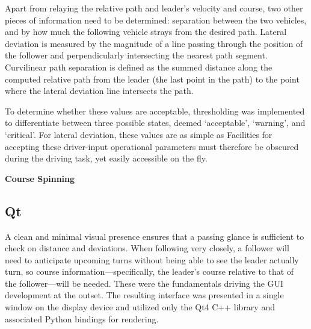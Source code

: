 \documentclass[twocolumn,10pt]{article}
\begin{document}
  Apart from relaying the relative path and leader's velocity and course, two other pieces of information need to be determined: separation between the two vehicles, and by how much the following vehicle strays from the desired path.
  Lateral deviation is measured by the magnitude of a line passing through the position of the follower and perpendicularly intersecting the nearest path segment.
  Curvilinear path separation is defined as the summed distance along the computed relative path from the leader (the last point in the path) to the point where the lateral deviation line intersects the path.


  To determine whether these values are acceptable, thresholding was implemented to differentiate between three possible states, deemed `acceptable', `warning', and `critical'.
  For lateral deviation, these values are as simple as 
  Facilities for accepting these driver-input operational parameters must therefore be obscured during the driving task, yet easily accessible on the fly. 

  \textbf{Course Spinning}

  \subsection*{Qt}
  
    A clean and minimal visual presence ensures that a passing glance is sufficient to check on distance and deviations.  When following very closely, a follower will need to anticipate upcoming turns without being able to see the leader actually turn, so course information---specifically, the leader's course relative to that of the follower---will be needed.  These were the fundamentals driving the GUI development at the outset.  The resulting interface was presented in a single window on the display device and utilized only the Qt4 C++ library \cite{qt} and associated Python bindings for rendering.
\end{document}
